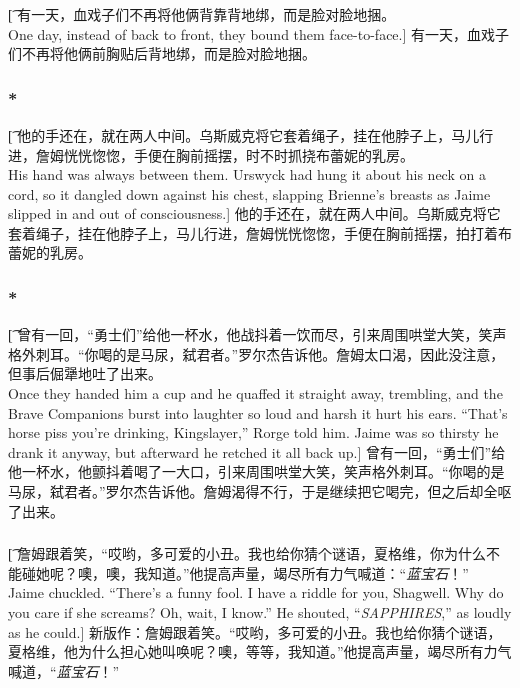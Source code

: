 \documentclass[12pt,a4paper]{article}
\begin{document}
\subsubsection{}\t[	
	有一天，血戏子们不再将他俩背靠背地绑，而是脸对脸地捆。\\
	One day, instead of back to front, they bound them face-to-face.]
	有一天，血戏子们不再将他俩前胸贴后背地绑，而是脸对脸地捆。
	
\subsubsection{\color{red}*}\t[	
	他的手还在，就在两人中间。乌斯威克将它套着绳子，挂在他脖子上，马儿行进，詹姆恍恍惚惚，手便在胸前摇摆，时不时抓挠布蕾妮的乳房。\\
	His hand was always between them. Urswyck had hung it about his neck on a cord, so it dangled down against his chest, slapping Brienne's breasts as Jaime slipped in and out of consciousness.]
	他的手还在，就在两人中间。乌斯威克将它套着绳子，挂在他脖子上，马儿行进，詹姆恍恍惚惚，手便在胸前摇摆，拍打着布蕾妮的乳房。
	
\subsubsection{\color{red}*}\t[	
	曾有一回，“勇士们”给他一杯水，他战抖着一饮而尽，引来周围哄堂大笑，笑声格外刺耳。“你喝的是马尿，弑君者。”罗尔杰告诉他。詹姆太口渴，因此没注意，但事后倔犟地吐了出来。\\
	Once they handed him a cup and he quaffed it straight away, trembling, and the Brave Companions burst into laughter so loud and harsh it hurt his ears. “That's horse piss you're drinking, Kingslayer,” Rorge told him. Jaime was so thirsty he drank it anyway, but afterward he retched it all back up.]	
	曾有一回，“勇士们”给他一杯水，他颤抖着喝了一大口，引来周围哄堂大笑，笑声格外刺耳。“你喝的是马尿，弑君者。”罗尔杰告诉他。詹姆渴得不行，于是继续把它喝完，但之后却全呕了出来。
	
\subsubsection{}\t[	
	詹姆跟着笑，“哎哟，多可爱的小丑。我也给你猜个谜语，夏格维，你为什么不能碰她呢？噢，噢，我知道。”他提高声量，竭尽所有力气喊道：“\emph{蓝宝石}！”\\
	Jaime chuckled. “There's a funny fool. I have a riddle for you, Shagwell. Why do you care if she screams? Oh, wait, I know.” He shouted, “\emph{SAPPHIRES},” as loudly as he could.]
	新版作：詹姆跟着笑。“哎哟，多可爱的小丑。我也给你猜个谜语，夏格维，他为什么担心她叫唤呢？噢，等等，我知道。”他提高声量，竭尽所有力气喊道，“\emph{蓝宝石}！”
	
\end{document}
